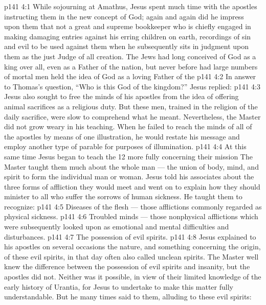 \vs p141 4:1 While sojourning at Amathus, Jesus spent much time with the apostles instructing them in the new concept of God; again and again did he impress upon them that  not a great and supreme bookkeeper who is chiefly engaged in making damaging entries against his erring children on earth, recordings of sin and evil to be used against them when he subsequently sits in judgment upon them as the just Judge of all creation. The Jews had long conceived of God as a king over all, even as a Father of the nation, but never before had large numbers of mortal men held the idea of God as a loving Father of the 
\vs p141 4:2 In answer to Thomas’s question, “Who is this God of the kingdom?” Jesus replied: 
\vs p141 4:3 Jesus also sought to free the minds of his apostles from the idea of offering animal sacrifices as a religious duty. But these men, trained in the religion of the daily sacrifice, were slow to comprehend what he meant. Nevertheless, the Master did not grow weary in his teaching. When he failed to reach the minds of all of the apostles by means of one illustration, he would restate his message and employ another type of parable for purposes of illumination.
\vs p141 4:4 \pc At this same time Jesus began to teach the 12 more fully concerning their mission  The Master taught them much about the whole man --- the union of body, mind, and spirit to form the individual man or woman. Jesus told his associates about the three forms of affliction they would meet and went on to explain how they should minister to all who suffer the sorrows of human sickness. He taught them to recognize:
\vs p141 4:5 \bibnobreakspace Diseases of the flesh --- those afflictions commonly regarded as physical sickness.
\vs p141 4:6 \bibnobreakspace Troubled minds --- those nonphysical afflictions which were subsequently looked upon as emotional and mental difficulties and disturbances.
\vs p141 4:7 \bibnobreakspace The possession of evil spirits.
\vs p141 4:8 \pc Jesus explained to his apostles on several occasions the nature, and something concerning the origin, of these evil spirits, in that day often also called unclean spirits. The Master well knew the difference between the possession of evil spirits and insanity, but the apostles did not. Neither was it possible, in view of their limited knowledge of the early history of Urantia, for Jesus to undertake to make this matter fully understandable. But he many times said to them, alluding to these evil spirits: 
